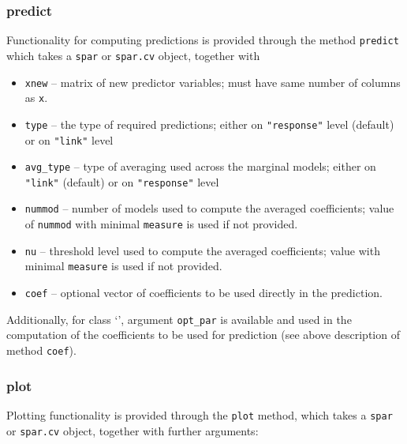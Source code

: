 \documentclass[
  article]{jss}
\newcommand{\class}[1]{`\code{#1}'}
\begin{document}
\subsubsection{predict}\label{predict}

Functionality for computing predictions is provided through the method
\texttt{predict} which takes a \texttt{spar} or \texttt{spar.cv} object,
together with

\begin{itemize}
\item
  \texttt{xnew} -- matrix of new predictor variables; must have same
  number of columns as \texttt{x}.
\item
  \texttt{type} -- the type of required predictions; either on
  \texttt{"response"} level (default) or on \texttt{"link"} level
\item
  \texttt{avg\_type} -- type of averaging used across the marginal
  models; either on \texttt{"link"} (default) or on \texttt{"response"}
  level
\item
  \texttt{nummod} -- number of models used to compute the averaged
  coefficients; value of \texttt{nummod} with minimal \texttt{measure}
  is used if not provided.
\item
  \texttt{nu} -- threshold level used to compute the averaged
  coefficients; value with minimal \texttt{measure} is used if not
  provided.
\item
  \texttt{coef} -- optional vector of coefficients to be used directly
  in the prediction.
\end{itemize}

Additionally, for class \class{spar.cv}, argument \texttt{opt\_par} is
available and used in the computation of the coefficients to be used for
prediction (see above description of method \texttt{coef}).

\subsubsection{plot}\label{plot}

Plotting functionality is provided through the \texttt{plot} method,
which takes a \texttt{spar} or \texttt{spar.cv} object, together with
further arguments:
\end{document}
